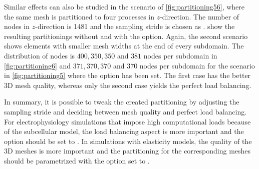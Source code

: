 Similar effects can also be studied in the scenario of \cref{fig:partitioning56}, where the same mesh is partitioned to four processes in $z$-direction. The number of nodes in $z$-direction is \num{1481} and the sampling stride is chosen as .  show the resulting partitionings without and with the  option. Again, the second scenario shows  elements with smaller mesh widths at the end of every subdomain. The distribution of nodes is $400,350,350$ and $381$ nodes per subdomain in \cref{fig:partitioning6} and $371,370,370$ and $370$ nodes per subdomain for the scenario in \cref{fig:partitioning5} where the  option has been set. The first case has the better 3D mesh quality, whereas only the second case yields the perfect load balancing.

In summary, it is possible to tweak the created partitioning by adjusting the sampling stride and deciding between mesh quality and perfect load balancing. For electrophysiology simulations that impose high computational loads because of the subcellular model, the load balancing aspect is more important and the option   should be set to . In simulations with elasticity models, the quality of the 3D meshes is more important and the partitioning for the corresponding meshes should be parametrized with the   option set to .

